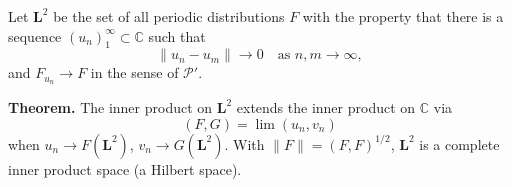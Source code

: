Let $\mathbf{L}^2$ be the set of all periodic distributions $F$ with the property that there is a sequence $(u_n)_{1}^{\infty} \subset \mathbb{C}$ such that
$$\|u_n - u_m\| \to 0 \quad \text{as } n, m \to \infty,$$
and $F_{u_n} \to F$ in the sense of $\mathcal{P}'$.

\textbf{Theorem.} The inner product on $\mathbf{L}^2$ extends the inner product on $\mathbb{C}$ via
$$(F, G) = \lim (u_n, v_n)$$
when $u_n \to F(\mathbf{L}^2)$, $v_n \to G(\mathbf{L}^2)$. With $\|F\| = (F,F)^{1/2}$, $\mathbf{L}^2$ is a complete inner product space (a Hilbert space).
